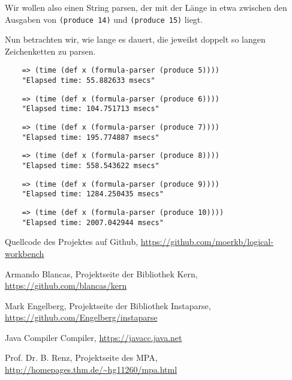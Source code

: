 \documentclass[ngerman,a4paper,abstracton,open=right,twoside=false,toc=listofnumbered,bibtotocnumbered]{scrreprt}
\begin{document}
Wir wollen also einen String parsen, der mit der Länge in etwa zwischen den Ausgaben von \lstinline|(produce 14)| und \lstinline|(produce 15)| liegt.

Nun betrachten wir, wie lange es dauert, die jeweilst doppelt so langen Zeichenketten zu parsen.

\begin{lstlisting}
	=> (time (def x (formula-parser (produce 5))))
	"Elapsed time: 55.882633 msecs"
\end{lstlisting}

\begin{lstlisting}
	=> (time (def x (formula-parser (produce 6))))
	"Elapsed time: 104.751713 msecs"
\end{lstlisting}

\begin{lstlisting}
	=> (time (def x (formula-parser (produce 7))))
	"Elapsed time: 195.774887 msecs"
\end{lstlisting}

\begin{lstlisting}
	=> (time (def x (formula-parser (produce 8))))
	"Elapsed time: 558.543622 msecs"
\end{lstlisting}

\begin{lstlisting}
	=> (time (def x (formula-parser (produce 9))))
	"Elapsed time: 1284.250435 msecs"
\end{lstlisting}

\begin{lstlisting}
	=> (time (def x (formula-parser (produce 10))))
	"Elapsed time: 2007.042944 msecs"
\end{lstlisting}

\appendix

\begin{thebibliography}{7}
		Quellcode des Projektes auf Github, 
		\url{https://github.com/moerkb/logical-workbench}

		Armando Blancas,
		Projektseite der Bibliothek Kern, 
		\url{https://github.com/blancas/kern}

		Mark Engelberg,
		Projektseite der Bibliothek Instaparse,
		\url{https://github.com/Engelberg/instaparse}

		Java Compiler Compiler,
		\url{https://javacc.java.net}

		Prof. Dr. B. Renz,
		Projektseite des MPA,
		\url{http://homepages.thm.de/~hg11260/mpa.html}
\end{thebibliography}
\end{document}
